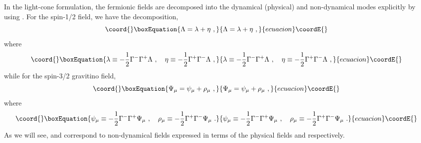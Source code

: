 \documentclass[a4paper,12pt]{article}
\numberwithin{equation}{section}
\begin{document}
In the light-cone formulation, the fermionic fields are decomposed into
the dynamical (physical) and non-dynamical modes explicitly by using
\myHighlight{$\{ \Gamma^+ , \Gamma^- \} = 2 \eta^{+-}$}\coordHE{}.  For the spin-1/2 field, we
have the decomposition,
\begin{equation}\coord{}\boxEquation{
\Lambda = \lambda + \eta ~,
\label{d1/2}
}{
\Lambda = \lambda + \eta ~,
}{ecuacion}\coordE{}\end{equation}
where
\begin{equation}\coord{}\boxEquation{
\lambda \equiv - \frac{1}{2} \Gamma^- \Gamma^+ \Lambda ~,~~~
\eta \equiv - \frac{1}{2} \Gamma^+ \Gamma^- \Lambda ~,
\label{d1/2-d}
}{
\lambda \equiv - \frac{1}{2} \Gamma^- \Gamma^+ \Lambda ~,~~~
\eta \equiv - \frac{1}{2} \Gamma^+ \Gamma^- \Lambda ~,
}{ecuacion}\coordE{}\end{equation}
while for the spin-3/2 gravitino field,
\begin{equation}\coord{}\boxEquation{
\Psi_\mu = \psi_\mu + \rho_\mu~,
\label{d3/2}
}{
\Psi_\mu = \psi_\mu + \rho_\mu~,
}{ecuacion}\coordE{}\end{equation}
where
\begin{equation}\coord{}\boxEquation{
\psi_\mu \equiv - \frac{1}{2} \Gamma^- \Gamma^+ \Psi_\mu ~,~~~
\rho_\mu \equiv - \frac{1}{2} \Gamma^+ \Gamma^- \Psi_\mu ~.
\label{d3/2-d}
}{
\psi_\mu \equiv - \frac{1}{2} \Gamma^- \Gamma^+ \Psi_\mu ~,~~~
\rho_\mu \equiv - \frac{1}{2} \Gamma^+ \Gamma^- \Psi_\mu ~.
}{ecuacion}\coordE{}\end{equation}
As we will see, \myHighlight{$\eta$}\coordHE{} and \myHighlight{$\rho_\mu$}\coordHE{} correspond to non-dynamical
fields expressed in terms of the physical fields \myHighlight{$\lambda$}\coordHE{} and
\myHighlight{$\psi_\mu$}\coordHE{} respectively.
\end{document}
